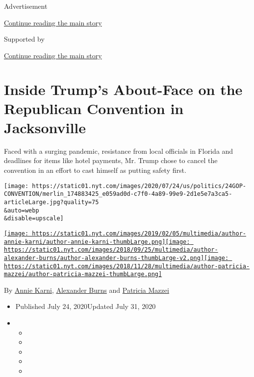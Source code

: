 Advertisement

\protect\hyperlink{after-top}{Continue reading the main story}

Supported by

\protect\hyperlink{after-sponsor}{Continue reading the main story}

\hypertarget{inside-trumps-about-face-on-the-republican-convention-in-jacksonville}{%
\section{Inside Trump's About-Face on the Republican Convention in
Jacksonville}\label{inside-trumps-about-face-on-the-republican-convention-in-jacksonville}}

Faced with a surging pandemic, resistance from local officials in
Florida and deadlines for items like hotel payments, Mr. Trump chose to
cancel the convention in an effort to cast himself as putting safety
first.

\texttt{[image: https://static01.nyt.com/images/2020/07/24/us/politics/24GOP-CONVENTION/merlin\_174883425\_e059ad0d-c7f0-4a89-99e9-2d1e5e7a3ca5-articleLarge.jpg?quality=75\\\&auto=webp\\\&disable=upscale]}

\href{https://www.nytimes.com/by/annie-karni}{\texttt{[image: https://static01.nyt.com/images/2019/02/05/multimedia/author-annie-karni/author-annie-karni-thumbLarge.png]}}\href{https://www.nytimes.com/by/alexander-burns}{\texttt{[image: https://static01.nyt.com/images/2018/09/25/multimedia/author-alexander-burns/author-alexander-burns-thumbLarge-v2.png]}}\href{https://www.nytimes.com/by/patricia-mazzei}{\texttt{[image: https://static01.nyt.com/images/2018/11/28/multimedia/author-patricia-mazzei/author-patricia-mazzei-thumbLarge.png]}}

By \href{https://www.nytimes.com/by/annie-karni}{Annie Karni},
\href{https://www.nytimes.com/by/alexander-burns}{Alexander Burns} and
\href{https://www.nytimes.com/by/patricia-mazzei}{Patricia Mazzei}

\begin{itemize}
\item
  Published July 24, 2020Updated July 31, 2020
\item
  \begin{itemize}
  \item
  \item
  \item
  \item
  \item
  \end{itemize}
\end{itemize}

